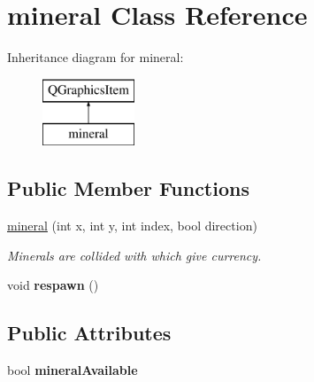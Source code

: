 \hypertarget{classmineral}{\section{mineral Class Reference}
\label{classmineral}
}
Inheritance diagram for mineral\-:\begin{figure}[H]
\begin{center}
\leavevmode
\includegraphics[height=2.000000cm]{classmineral}
\end{center}
\end{figure}
\subsection*{Public Member Functions}
\begin{DoxyCompactItemize}
\item 
\hyperlink{classmineral_ade23474b2da78ce2240dec5341e8cfdf}{mineral} (int x, int y, int index, bool direction)
\begin{DoxyCompactList}\small\item\em Minerals are collided with which give currency. \end{DoxyCompactList}\item 
\hypertarget{classmineral_adc74ea172cd5c998f6255c97e9268100}{void {\bfseries respawn} ()}\label{classmineral_adc74ea172cd5c998f6255c97e9268100}

\end{DoxyCompactItemize}
\subsection*{Public Attributes}
\begin{DoxyCompactItemize}
\item 
\hypertarget{classmineral_a3c1b2c2b147daed638f02af01c14bb75}{bool {\bfseries mineral\-Available}}\label{classmineral_a3c1b2c2b147daed638f02af01c14bb75}

\end{DoxyCompactItemize}
